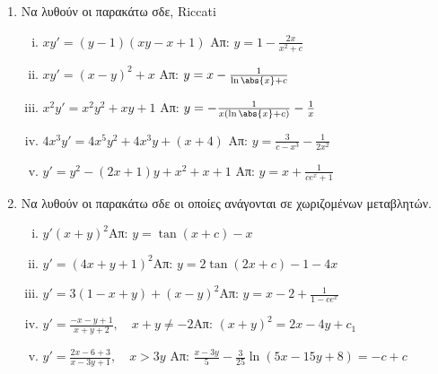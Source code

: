 \begin{enumerate}
  \item Να λυθούν οι παρακάτω σδε, Riccati

    \begin{enumerate}[i)]
      \item $xy'=(y-1)(xy-x+1)$ \hfill Απ: $y=1-\frac{2x}{x^2+c}$
      \item $xy'=(x-y)^2+x$ \hfill Απ: $y=x-\frac{1}{\ln\abs{x}+c}$
      \item $x^2y'=x^2y^2+xy+1$ \hfill Απ: $y=-\frac{1}{x(\ln\abs{x}+c)}-\frac{1}{x}$
      \item $4x^3y'=4x^5y^2+4x^3y+(x+4)$ \hfill Απ: $y=\frac{3}{c-x^3}-\frac{1}{2x^2}$
      \item $y'=y^2-(2x+1)y+x^2+x+1$ \hfill Απ: $y=x+\frac{1}{ce^x+1}$
    \end{enumerate}

  \item Να λυθούν οι παρακάτω σδε οι οποίες ανάγονται σε χωριζομένων μεταβλητών.

    \begin{enumerate}[i)]
      \item $y'(x+y)^2$\hfill Απ: $y=\tan (x+c)-x$
      \item $y'=(4x+y+1)^2$\hfill Απ: $y=2\tan(2x+c)-1-4x$
      \item $y'=3(1-x+y)+(x-y)^2$\hfill Απ: $y=x-2+\frac{1}{1-ce^x}$
      \item $y'=\frac{-x-y+1}{x+y+2}, \quad x+y\neq -2$\hfill Απ: $(x+y)^2=2x-4y+c_1$
      \item $y'=\frac{2x-6+3}{x-3y+1}, \quad x>3y$
        \hfill Απ: $\frac{x-3y}{5}-\frac{3}{25}\ln(5x-15y+8)=-c+c$
    \end{enumerate}

\end{enumerate}



